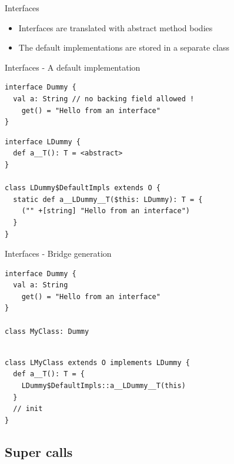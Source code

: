 \documentclass[10pt,usenames,dvipsnames]{beamer}
\begin{document}
\begin{frame}{Interfaces}
  \begin{itemize}
   \item Interfaces are translated with abstract method bodies
   \item The default implementations are stored in a separate class
  \end{itemize}

\end{frame}

\begin{frame}[fragile]{Interfaces - A default implementation}
 \begin{verbatim}
interface Dummy {
  val a: String // no backing field allowed !
    get() = "Hello from an interface"
}
 \end{verbatim}
 
 \begin{verbatim}
interface LDummy {
  def a__T(): T = <abstract>
}

class LDummy$DefaultImpls extends O {
  static def a__LDummy__T($this: LDummy): T = {
    ("" +[string] "Hello from an interface")
  }
}
 \end{verbatim}


\end{frame}


\begin{frame}[fragile]{Interfaces - Bridge generation}

 \begin{verbatim}
interface Dummy {
  val a: String
    get() = "Hello from an interface"
}

class MyClass: Dummy
 \end{verbatim}
 
 \begin{verbatim}

class LMyClass extends O implements LDummy {
  def a__T(): T = {
    LDummy$DefaultImpls::a__LDummy__T(this)
  }
  // init
}
 \end{verbatim}
 
\end{frame}


\subsection{Super calls}
\end{document}
